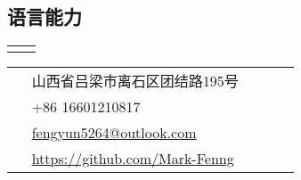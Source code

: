 \documentclass[10pt]{article} %
\begin{document}
\begin{paracol}{2}
\section{语言能力}





\begin{supertabular}{rl} %
	
	
	
	
	
	
\end{supertabular}


\switchcolumn %


\parbox[top][0.12\textheight][c]{\linewidth}{ %
	\vspace{-0.04\textheight} %
	\colorbox{shade}{ %
		\begin{supertabular}{p{0.05\linewidth}|p{0.775\linewidth}} %
			\raisebox{-1pt}{\faHome} & \small{山西省吕梁市离石区团结路195号} \\ %
			\raisebox{-1pt}{\faPhone} & +86 16601210817 \\ %
			\raisebox{0pt}{\small\faEnvelope} & \href{mailto:fengyun5264@outlook.com}{fengyun5264@outlook.com} \\ %
			\raisebox{-1pt}{\faGithub} & \href{https://github.com/Mark-Fenng}{https://github.com/Mark-Fenng} \\ %
		\end{supertabular}
	}
}


\end{paracol}
\end{document}
